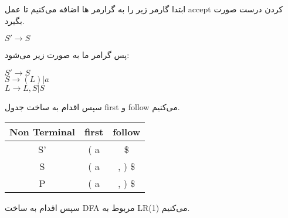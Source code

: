 

ابتدا گارمر زیر را به گرارمر ها اضافه می‌کنیم تا عمل accept کردن درست صورت بگیرد.

\begin{center}
\begin{latin}
$S' \rightarrow S$
\end{latin}
\end{center}

پس گرامر ما به صورت زیر می‌شود:

\begin{center}
\begin{latin}
$S' \rightarrow S$
\\
$S \rightarrow (L) | a$
\\
$L \rightarrow L,S | S$
\end{latin}
\end{center}

سپس اقدام به ساخت جدول first و follow می‌کنیم.

\begin{center}
    \begin{latin}
        \begin{tabular}{|c|c|c|}
            \hline
            Non Terminal & first & follow \\ \hline
            S'           & ( a   & \$     \\ \hline
            S            & ( a   & , ) \$  \\ \hline
            P            & ( a   & , ) \$  \\ \hline
        \end{tabular}
    \end{latin}
\end{center}

سپس اقدام به ساخت DFA مربوط به LR(1) می‌کنیم.


